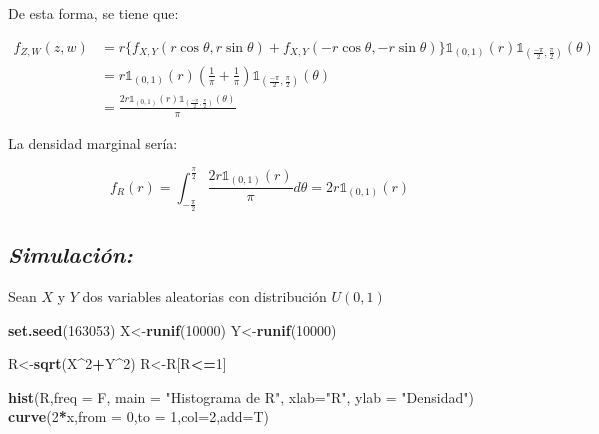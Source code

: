 \documentclass[]{article}
\newenvironment{Shaded}{\begin{snugshade}}{\end{snugshade}}
\newcommand{\KeywordTok}[1]{\textcolor[rgb]{0.13,0.29,0.53}{\textbf{#1}}}
\newcommand{\DataTypeTok}[1]{\textcolor[rgb]{0.13,0.29,0.53}{#1}}
\newcommand{\DecValTok}[1]{\textcolor[rgb]{0.00,0.00,0.81}{#1}}
\newcommand{\StringTok}[1]{\textcolor[rgb]{0.31,0.60,0.02}{#1}}
\newcommand{\OperatorTok}[1]{\textcolor[rgb]{0.81,0.36,0.00}{\textbf{#1}}}
\newcommand{\NormalTok}[1]{#1}
\begin{document}
De esta forma, se tiene que:

\begin{equation}
\begin{split}
f_{Z,W}(z,w)&=r\{ f_{X,Y}(r\cos\theta,r\sin\theta) + f_{X,Y}(-r\cos\theta,-r\sin\theta)  \}
\mathbb{1}_{(0,1)}(r)\mathbb{1}_{\left(\frac{-\pi}{2},\frac{\pi}{2}\right)}(\theta)\\
&=r\mathbb{1}_{(0,1)}(r)\left(\frac{1}{\pi}+\frac{1}{\pi}\right)\mathbb{1}_{\left(\frac{-\pi}{2},\frac{\pi}{2}\right)}(\theta)\\
&=\frac{2r\mathbb{1}_{(0,1)}(r)\mathbb{1}_{\left(\frac{-\pi}{2},\frac{\pi}{2}\right)}(\theta)}{\pi}
\end{split}
\end{equation}

La densidad marginal sería:

\begin{equation}
f_R(r)=\int_{-\frac{\pi}{2}}^{\frac{\pi}{2}}\frac{2r\mathbb{1}_{(0,1)}(r)}{\pi}d\theta=2r\mathbb{1}_{(0,1)}(r)
\end{equation}

\subsection{\texorpdfstring{\emph{Simulación:}}{Simulación:}}\label{simulacion}

Sean \(X\) y \(Y\) dos variables aleatorias con distribución \(U(0,1)\)

\begin{Shaded}
\begin{Highlighting}[]
\KeywordTok{set.seed}\NormalTok{(}\DecValTok{163053}\NormalTok{)}
\NormalTok{X<-}\KeywordTok{runif}\NormalTok{(}\DecValTok{10000}\NormalTok{)}
\NormalTok{Y<-}\KeywordTok{runif}\NormalTok{(}\DecValTok{10000}\NormalTok{)}

\NormalTok{R<-}\KeywordTok{sqrt}\NormalTok{(X}\OperatorTok{^}\DecValTok{2}\OperatorTok{+}\NormalTok{Y}\OperatorTok{^}\DecValTok{2}\NormalTok{)}
\NormalTok{R<-R[R}\OperatorTok{<=}\DecValTok{1}\NormalTok{]}

\KeywordTok{hist}\NormalTok{(R,}\DataTypeTok{freq =}\NormalTok{ F, }\DataTypeTok{main =} \StringTok{"Histograma de R"}\NormalTok{, }\DataTypeTok{xlab=}\StringTok{"R"}\NormalTok{, }\DataTypeTok{ylab =} \StringTok{"Densidad"}\NormalTok{)}
\KeywordTok{curve}\NormalTok{(}\DecValTok{2}\OperatorTok{*}\NormalTok{x,}\DataTypeTok{from =} \DecValTok{0}\NormalTok{,}\DataTypeTok{to =} \DecValTok{1}\NormalTok{,}\DataTypeTok{col=}\DecValTok{2}\NormalTok{,}\DataTypeTok{add=}\NormalTok{T)}
\end{Highlighting}
\end{Shaded}
\end{document}
